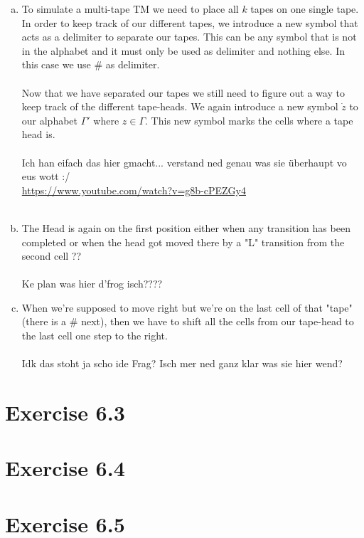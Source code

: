 \documentclass{article} %
\newcommand{\homeworkNumber}{6}
\begin{document}
\begin{enumerate}[(a)]
\item
To simulate a multi-tape TM we need to place all $k$ tapes on one single tape. In order to keep track of our different tapes, we introduce a new symbol that acts as a delimiter to separate our tapes. This can be any symbol that is not in the alphabet and it must only be used as delimiter and nothing else. In this case we use $\#$ as delimiter.\\\\
Now that we have separated our tapes we still need to figure out a way to keep track of the different tape-heads. We again introduce a new symbol $\dot{z}$ to our alphabet $\Gamma'$ where $z \in \Gamma$. This new symbol marks the cells where a tape head is. \\\\
Ich han eifach das hier gmacht... verstand ned genau was sie überhaupt vo eus wott :/ \\
\href{https://www.youtube.com/watch?v=g8b-cPEZGy4}{https://www.youtube.com/watch?v=g8b-cPEZGy4}\\\\



\item
The Head is again on the first position either when any transition has been completed or when the head got moved there by a "L" transition from the second cell ?? \\\\
Ke plan was hier d'frog isch????

\item
When we're supposed to move right but we're on the last cell of that "tape" (there is a $\#$ next), then we have to shift all the cells from our tape-head to the last cell one step to the right.\\\\
Idk das stoht ja scho ide Frag? Isch mer ned ganz klar was sie hier wend?


\end{enumerate}

\clearpage

\section*{Exercise \homeworkNumber.3}


\section*{Exercise \homeworkNumber.4}


\section*{Exercise \homeworkNumber.5}
\end{document}
